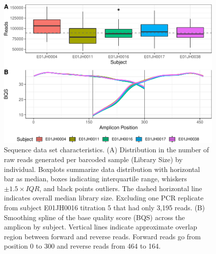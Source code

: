 \documentclass[12pt]{article}
\begin{document}
\begin{table}
\caption{\label{tab:TAandUSsummary}Summary of abundance of titration-specific and unmixed-specific features per pipeline. These numbers are only for E01JH0004 and are directly related to the proportions described in Supplemental Fig. \ref{fig:bayesPrior} for alpha = beta = 1.}
\centering
{}
\end{table}

\begin{figure}
\centering
\includegraphics[width=0.9\linewidth]{qaPlots-1.pdf}
\caption{\label{fig:qaPlots}Sequence data set characteristics. (A)
Distribution in the number of raw reads generated per barcoded sample (Library Size)
by individual. Boxplots summarize data distribution with horizontal bar
as median, boxes indicating interquartile range, whiskers
\(\pm 1.5\times IQR\), and black points outliers. The dashed horizontal
line indicates overall median library size. Excluding one PCR replicate
from subject E01JH0016 titration 5 that had only 3,195 reads. (B)
Smoothing spline of the base quality score (BQS) across the amplicon by
subject. Vertical lines indicate approximate overlap region between
forward and reverse reads. Forward reads go from position 0 to 300 and
reverse reads from 464 to 164.
}
\end{figure}
\end{document}
